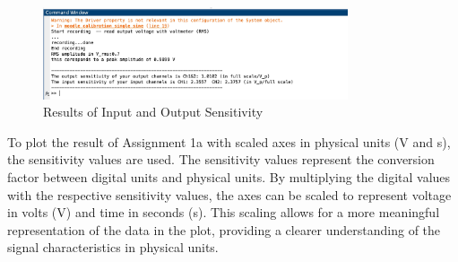 \documentclass[
	a4paper,
	11pt,
]{article}
\begin{document}
\indent
\begin{figure}[htb!]
    \centerline{\includegraphics[width=9cm]{2_img/2(b)(c).jpg}}
     \caption[ Results of Input and Output Sensitivity ]
        {\small Results of Input and Output Sensitivity}
\end{figure}
\indent


To plot the result of Assignment 1a with scaled axes in physical units (V and s), the sensitivity values are used. The sensitivity values represent the conversion factor between digital units and physical units. By multiplying the digital values with the respective sensitivity values, the axes can be scaled to represent voltage in volts (V) and time in seconds (s). This scaling allows for a more meaningful representation of the data in the plot, providing a clearer understanding of the signal characteristics in physical units.
\end{document}
